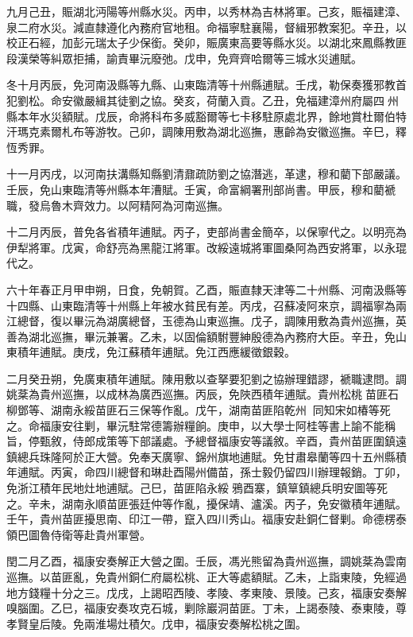 \begin{pinyinscope}
九月己丑，賑湖北沔陽等州縣水災。丙申，以秀林為吉林將軍。己亥，賑福建漳、泉二府水災。減直隸遵化內務府官地租。命福寧駐襄陽，督緝邪教案犯。辛丑，以校正石經，加彭元瑞太子少保銜。癸卯，賑廣東高要等縣水災。以湖北來鳳縣教匪段漢榮等糾眾拒捕，諭責畢沅廢弛。戊申，免齊齊哈爾等三城水災逋賦。

冬十月丙辰，免河南汲縣等九縣、山東臨清等十州縣逋賦。壬戌，勒保奏獲邪教首犯劉松。命安徽嚴緝其徒劉之協。癸亥，荷蘭入貢。乙丑，免福建漳州府屬四州縣本年水災額賦。戊辰，命將科布多威豁爾等七卡移駐原處北界，餘地賞杜爾伯特汗瑪克素爾札布等游牧。己卯，調陳用敷為湖北巡撫，惠齡為安徽巡撫。辛巳，釋恆秀罪。

十一月丙戌，以河南扶溝縣知縣劉清鼐疏防劉之協潛逃，革逮，穆和藺下部嚴議。壬辰，免山東臨清等州縣本年漕賦。壬寅，命富綱署刑部尚書。甲辰，穆和藺褫職，發烏魯木齊效力。以阿精阿為河南巡撫。

十二月丙辰，普免各省積年逋賦。丙子，吏部尚書金簡卒，以保寧代之。以明亮為伊犁將軍。戊寅，命舒亮為黑龍江將軍。改綏遠城將軍圖桑阿為西安將軍，以永琨代之。

六十年春正月甲申朔，日食，免朝賀。乙酉，賑直隸天津等二十州縣、河南汲縣等十四縣、山東臨清等十州縣上年被水貧民有差。丙戌，召蘇凌阿來京，調福寧為兩江總督，復以畢沅為湖廣總督，玉德為山東巡撫。戊子，調陳用敷為貴州巡撫，英善為湖北巡撫，畢沅兼署。乙未，以固倫額駙豐紳殷德為內務府大臣。辛丑，免山東積年逋賦。庚戌，免江蘇積年逋賦。免江西應緩徵銀穀。

二月癸丑朔，免廣東積年逋賦。陳用敷以查拏要犯劉之協辦理錯謬，褫職逮問。調姚棻為貴州巡撫，以成林為廣西巡撫。丙辰，免陜西積年逋賦。貴州松桃苗匪石柳鄧等、湖南永綏苗匪石三保等作亂。戊午，湖南苗匪陷乾州，同知宋如椿等死之。命福康安往剿，畢沅駐常德籌辦糧餉。庚申，以大學士阿桂等書上諭不能稱旨，停甄敘，侍郎成策等下部議處。予總督福康安等議敘。辛酉，貴州苗匪圍鎮遠鎮總兵珠隆阿於正大營。免奉天廣寧、錦州旗地逋賦。免甘肅皋蘭等四十五州縣積年逋賦。丙寅，命四川總督和琳赴酉陽州備苗，孫士毅仍留四川辦理報銷。丁卯，免浙江積年民地灶地逋賦。己巳，苗匪陷永綏鴉酉寨，鎮筸鎮總兵明安圖等死之。辛未，湖南永順苗匪張廷仲等作亂，擾保靖、瀘溪。丙子，免安徽積年逋賦。壬午，貴州苗匪擾思南、印江一帶，竄入四川秀山。福康安赴銅仁督剿。命德楞泰領巴圖魯侍衛等赴貴州軍營。

閏二月乙酉，福康安奏解正大營之圍。壬辰，馮光熊留為貴州巡撫，調姚棻為雲南巡撫。以苗匪亂，免貴州銅仁府屬松桃、正大等處額賦。乙未，上詣東陵，免經過地方錢糧十分之三。戊戌，上謁昭西陵、孝陵、孝東陵、景陵。己亥，福康安奏解嗅腦圍。乙巳，福康安奏攻克石城，剿除巖洞苗匪。丁未，上謁泰陵、泰東陵，尊孝賢皇后陵。免兩淮場灶積欠。戊申，福康安奏解松桃之圍。


\end{pinyinscope}
